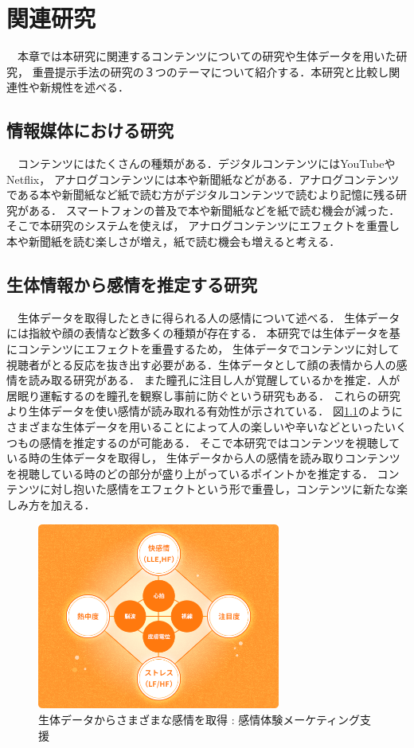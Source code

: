 \thispagestyle{myheadings}
\chapter{関連研究}
　本章では本研究に関連するコンテンツについての研究や生体データを用いた研究，
重畳提示手法の研究の３つのテーマについて紹介する．本研究と比較し関連性や新規性を述べる．



\section{情報媒体における研究}
　コンテンツにはたくさんの種類がある．デジタルコンテンツにはYouTubeやNetflix，
アナログコンテンツには本や新聞紙などがある．アナログコンテンツである本や新聞紙など紙で読む方がデジタルコンテンツで読むより記憶に残る研究がある\cite{books}．
スマートフォンの普及で本や新聞紙などを紙で読む機会が減った．そこで本研究のシステムを使えば，
アナログコンテンツにエフェクトを重畳し本や新聞紙を読む楽しさが増え，紙で読む機会も増えると考える．

\section{生体情報から感情を推定する研究}

　生体データを取得したときに得られる人の感情について述べる．
生体データには指紋や顔の表情など数多くの種類が存在する．
本研究では生体データを基にコンテンツにエフェクトを重畳するため，
生体データでコンテンツに対して視聴者がとる反応を抜き出す必要がある．生体データとして顔の表情から人の感情を読み取る研究がある\cite{hyoujou,hyoujou2}．
また瞳孔に注目し人が覚醒しているかを推定．人が居眠り運転するのを瞳孔を観察し事前に防ぐという研究もある\cite{doukou}．
これらの研究より生体データを使い感情が読み取れる有効性が示されている．
図\ref{seitaidata}のようにさまざまな生体データを用いることによって人の楽しいや辛いなどといったいくつもの感情を推定するのが可能ある．
そこで本研究ではコンテンツを視聴している時の生体データを取得し，
生体データから人の感情を読み取りコンテンツを視聴している時のどの部分が盛り上がっているポイントかを推定する．
コンテンツに対し抱いた感情をエフェクトという形で重畳し，コンテンツに新たな楽しみ方を加える．

\begin{figure}[H]
    \centering
    \includegraphics[width=8cm]{images/chapter2/heart.png}
    \caption{生体データからさまざまな感情を取得 : 感情体験メーケティング支援}
    \label{seitaidata}
\end{figure}


